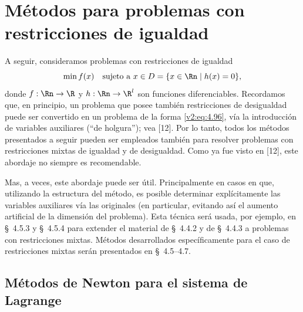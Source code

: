 
\section{Métodos para problemas con restricciones de igualdad}\label{v2:sec:4.4}

A seguir, consideramos problemas con restricciones de igualdad
\begin{equation}
    \min f(x) \quad \text{sujeto a } x \in D = \{x \in \Rn \mid h(x) = 0\},
    \label{v2:eq:4.96}
\end{equation}
donde $f : \Rn \to \R$ y $h : \Rn \to \R^l$ son funciones diferenciables. Recordamos que, en principio, un problema que posee también restricciones de desigualdad puede ser convertido en un problema de la forma \eqref{v2:eq:4.96}, vía la introducción de variables auxiliares (``de holgura''); vea [12]. Por lo tanto, todos los métodos presentados a seguir pueden ser empleados también para resolver problemas con restricciones mixtas de igualdad y de desigualdad. Como ya fue visto en [12], este abordaje no siempre es recomendable.

Mas, a veces, este abordaje puede ser útil. Principalmente en casos en que, utilizando la estructura del método, es posible determinar explícitamente las variables auxiliares vía las originales (en particular, evitando así el aumento artificial de la dimensión del problema). Esta técnica será usada, por ejemplo, en \S~4.5.3 y \S~4.5.4 para extender el material de \S~4.4.2 y de \S~4.4.3 a problemas con restricciones mixtas. Métodos desarrollados específicamente para el caso de restricciones mixtas serán presentados en \S~4.5--4.7.

\subsection{Métodos de Newton para el sistema de Lagrange}\label{v2:sec:4.4.1}

